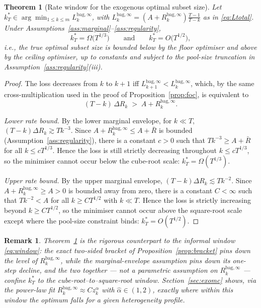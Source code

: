 \documentclass[12pt,a4paper]{article}
\newtheorem{theorem}[proposition]{Theorem}
\newtheorem{remark}{Remark}
\theoremstyle{definition}
\newcommand{\Rk}{R_k^{\mathrm{bag},\infty}}
\begin{document}
\begin{theorem}[Rate window for the exogenous optimal subset size]\label{thm:ratewindow}
Let $k_T^*\in\arg\min_{1\le k\le m}L_k^{\mathrm{bag},\infty}$, with
$L_k^{\mathrm{bag},\infty}=(A+\Rk)\frac{T-1}{T-k}$ as in \eqref{eq:Ltotal}.
Under Assumptions~\ref{ass:marginal}--\ref{ass:regularity},
\begin{equation*}
  k_T^* = \Omega\bigl(T^{1/3}\bigr)
  \qquad\text{and}\qquad
  k_T^* = O\bigl(T^{1/2}\bigr),
\end{equation*}
i.e., the true optimal subset size is bounded below by the floor optimiser
and above by the ceiling optimiser, up to constants and subject to the
pool-size truncation in Assumption~\ref{ass:regularity}(iii).
\end{theorem}

\begin{proof}
The loss decreases from $k$ to $k+1$ iff
$L_{k+1}^{\mathrm{bag},\infty}<L_k^{\mathrm{bag},\infty}$, which, by the same
cross-multiplication used in the proof of Proposition~\ref{prop:foc}, is
equivalent to
\begin{equation*}
  (T-k)\,\Delta R_k \;>\; A+\Rk.
\end{equation*}

\emph{Lower rate bound.}  By the lower marginal envelope, for $k\ll T$,
$(T-k)\Delta R_k\gtrsim Tk^{-3}$.  Since $A+\Rk\le A+\bar R$ is bounded
(Assumption~\ref{ass:regularity}), there is a constant $c>0$ such that
$Tk^{-3}\ge A+\bar R$ for all $k\le cT^{1/3}$.  Hence the loss is still
strictly decreasing throughout $k\le cT^{1/3}$, so the minimiser cannot
occur below the cube-root scale: $k_T^*=\Omega(T^{1/3})$.

\emph{Upper rate bound.}  By the upper marginal envelope,
$(T-k)\Delta R_k\lesssim Tk^{-2}$.  Since $A+\Rk\ge A>0$ is bounded away
from zero, there is a constant $C<\infty$ such that $Tk^{-2}<A$ for all
$k\ge CT^{1/2}$ with $k\ll T$.  Hence the loss is strictly increasing beyond
$k\ge CT^{1/2}$, so the minimiser cannot occur above the square-root scale
except where the pool-size constraint binds: $k_T^*=O(T^{1/2})$.
\end{proof}

\begin{remark}
Theorem~\ref{thm:ratewindow} is the rigorous counterpart to the informal
window \eqref{eq:window}: the exact two-sided bracket of
Proposition~\ref{prop:bracket} pins down the \emph{level} of $\Rk$, while the
marginal-envelope assumption pins down its \emph{one-step decline}, and the
two together --- not a parametric assumption on $\Rk$ --- confine $k_T^*$ to
the cube-root--to--square-root window.  Section~\ref{sec:exomc} shows, via
the power-law fit $\Rk\approx Cz_k^\alpha$ with $\hat\alpha\in(1,2)$, exactly
where within this window the optimum falls for a given heterogeneity
profile.
\end{remark}
\end{document}
